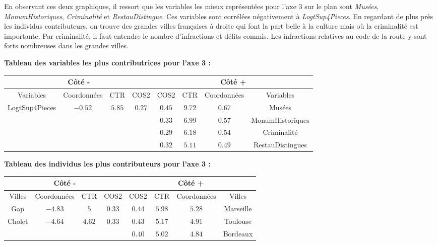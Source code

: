 \documentclass{article}
\begin{document}
En observant ces deux graphiques, il ressort que les variables les mieux représentées pour l'axe 3 sur le plan sont \emph{Musées}, \emph{MonumHistoriques}, \emph{Criminalité} et \emph{RestauDistingue}. Ces variables sont corrélées négativement à \emph{LogtSup4Pieces}. En regardant de plus près les individus contributeurs, on trouve des grandes villes françaises à droite qui font la part belle à la culture mais où la criminalité est importante. Par criminalité, il faut entendre le nombre d'infractions et délits commis. Les infractions relatives au code de la route y sont forts nombreuses dans les grandes villes.

\textbf{Tableau des variables les plus contributrices pour l'axe 3 :}
\begin{center}
\begin{tabular}{|c|c|c|c||c|c|c|c|}
\multicolumn{4}{c}{Côté -} & \multicolumn{4}{c}{Côté +}\\
\hline 
Variables & Coordonnées & CTR & COS2 & COS2 & CTR & Coordonnées & Variables \\ 
\hline 
LogtSup4Pieces & $-0.52$ & $5.85$ & $0.27$  & $0.45$  & $9.72$ & $0.67$ & Musées  \\ 
\hline 
&  &  &  & $0.33$ & $6.99$ &  $0.57$ &  MonumHistoriques\\ 
\hline 
&  &  &  & $0.29$ & $6.18$ & $0.54$ & Criminalité \\ 
\hline 
&  &  &  & $0.32$ & $5.11$ & $0.49$ & RestauDistingues \\ 
\hline
\end{tabular} 
\end{center}

\bigskip

\textbf{Tableau des individus les plus contributeurs pour l'axe 3 :}
\begin{center}
\begin{tabular}{|c|c|c|c||c|c|c|c|}
\multicolumn{4}{c}{Côté -} & \multicolumn{4}{c}{Côté +}\\
\hline 
Villes & Coordonnées & CTR & COS2 & COS2 & CTR & Coordonnées & Villes \\ 
\hline 
Gap & $-4.83$ & $5$ & $0.33$ & $0.44$ & $5.98$ & $5.28$ & Marseille\\
\hline
 Cholet & $-4.64$  & $4.62$  & $0.33$ & $0.43$ & $5.17$ & $4.91$ & Toulouse\\ 
\hline 
 &  &  &  & $0.40$ & $5.02$ & $4.84$ & Bordeaux\\ 
\hline 
\end{tabular} 
\end{center}
\end{document}

